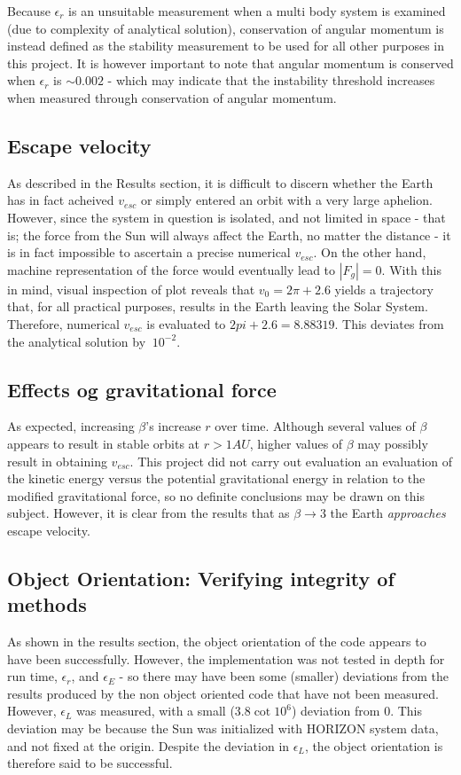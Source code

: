\documentclass[%
oneside,                 %
final,                   %
10pt]{article}
\begin{document}
Because $\epsilon_r$ is an unsuitable measurement when a multi body system is examined (due to complexity of analytical solution), conservation of angular momentum is instead defined as the stability measurement to be used for all other purposes in this project. It is however important to note that angular momentum is conserved when $\epsilon_r$ is $\sim 0.002$ - which may indicate that the instability threshold increases when measured through conservation of angular momentum. 

\subsection{Escape velocity}
As described in the Results section, it is difficult to discern whether the Earth has in fact  acheived $v_{esc}$ or simply entered an orbit with a very large aphelion. However, since the system in question is isolated, and not limited in space - that is; the force from the Sun will always affect the Earth, no matter the distance - it is in fact impossible to ascertain a precise numerical $v_{esc}$. On the other hand, machine representation of the force would eventually lead to $|F_g|=0$. With this in mind, visual inspection of plot reveals that $ v_0=2\pi+2.6$ yields a trajectory that, for all practical purposes, results in the Earth leaving the Solar System. Therefore, numerical $v_{esc}$ is evaluated to $ 2pi+2.6 = 8.88319$. This deviates from the analytical solution by $~10^{-2}$.

\subsection{Effects og gravitational force}
As expected, increasing $\beta$'s increase $r$ over time. Although several values of $\beta$ appears to result in stable orbits at $r>1 AU$, higher values of $\beta$ may possibly result in obtaining $v_{esc}$. This project did not carry out evaluation an evaluation of the kinetic energy versus the potential gravitational energy in relation to the modified gravitational force, so no definite conclusions may be drawn on this subject. However, it is clear from the results that as $\beta \rightarrow 3$ the Earth \textit{approaches} escape velocity. 

\subsection{Object Orientation: Verifying integrity of methods} 
As shown in the results section, the object orientation of the code appears to have been successfully. However, the implementation was not tested in depth for run time, $\epsilon_r$, and $\epsilon_E$ - so there may have been some (smaller) deviations from the results produced by the non object oriented code that have not been measured. However, $\epsilon_L$ was measured, with a small ($3.8 \cot 10^6$) deviation from $0$. This deviation may be because the Sun was initialized with HORIZON system data, and not fixed at the origin. Despite the deviation in $\epsilon_L$, the object orientation is therefore said to be successful.
\end{document}
